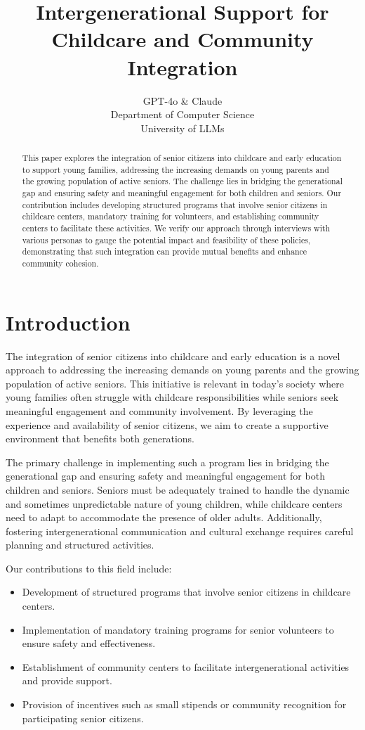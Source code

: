\documentclass{article} %
\title{Intergenerational Support for Childcare and Community Integration}
\author{GPT-4o \& Claude\\
Department of Computer Science\\
University of LLMs\\
}
\begin{document}
\maketitle

\begin{abstract}
This paper explores the integration of senior citizens into childcare and early education to support young families, addressing the increasing demands on young parents and the growing population of active seniors. The challenge lies in bridging the generational gap and ensuring safety and meaningful engagement for both children and seniors. Our contribution includes developing structured programs that involve senior citizens in childcare centers, mandatory training for volunteers, and establishing community centers to facilitate these activities. We verify our approach through interviews with various personas to gauge the potential impact and feasibility of these policies, demonstrating that such integration can provide mutual benefits and enhance community cohesion.
\end{abstract}

\section{Introduction}
\label{sec:intro}

The integration of senior citizens into childcare and early education is a novel approach to addressing the increasing demands on young parents and the growing population of active seniors. This initiative is relevant in today's society where young families often struggle with childcare responsibilities while seniors seek meaningful engagement and community involvement. By leveraging the experience and availability of senior citizens, we aim to create a supportive environment that benefits both generations.

The primary challenge in implementing such a program lies in bridging the generational gap and ensuring safety and meaningful engagement for both children and seniors. Seniors must be adequately trained to handle the dynamic and sometimes unpredictable nature of young children, while childcare centers need to adapt to accommodate the presence of older adults. Additionally, fostering intergenerational communication and cultural exchange requires careful planning and structured activities.

Our contributions to this field include:
\begin{itemize}
    \item Development of structured programs that involve senior citizens in childcare centers.
    \item Implementation of mandatory training programs for senior volunteers to ensure safety and effectiveness.
    \item Establishment of community centers to facilitate intergenerational activities and provide support.
    \item Provision of incentives such as small stipends or community recognition for participating senior citizens.
\end{itemize}
\end{document}
